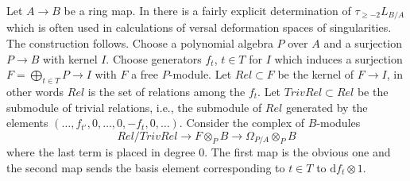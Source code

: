 \noindent
Let $A \to B$ be a ring map. In \cite{Lichtenbaum-Schlessinger}
there is a fairly explicit determination of $\tau_{\geq -2}L_{B/A}$
which is often used in calculations of versal deformation spaces of
singularities. The construction follows.
Choose a polynomial algebra $P$ over $A$
and a surjection $P \to B$ with kernel $I$. Choose generators
$f_t$, $t \in T$ for $I$ which induces a surjection
$F = \bigoplus_{t \in T} P \to I$ with $F$ a free $P$-module.
Let $Rel \subset F$ be the kernel of $F \to I$, in other words
$Rel$ is the set of relations among the $f_t$. Let $TrivRel \subset Rel$
be the submodule of trivial relations, i.e., the submodule of $Rel$
generated by the elements $(\ldots, f_{t'}, 0, \ldots, 0, -f_t, 0, \ldots)$.
Consider the complex of $B$-modules
\begin{equation}
\label{equation-lichtenbaum-schlessinger}
Rel/TrivRel \longrightarrow
F \otimes_P B \longrightarrow
\Omega_{P/A} \otimes_P B
\end{equation}
where the last term is placed in degree $0$. The first map is the obvious
one and the second map sends the basis element corresponding to $t \in T$
to $\text{d}f_t \otimes 1$.